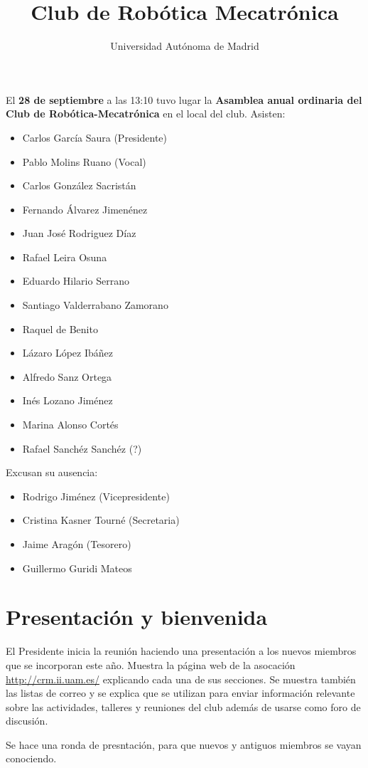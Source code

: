 \documentclass[a4paper]{article}
\title{Club de Robótica Mecatrónica}
\author{Universidad Autónoma de Madrid}
\begin{document}
El \textbf{28 de septiembre} a las 13:10 tuvo lugar la \textbf{Asamblea anual ordinaria del Club de Robótica-Mecatrónica} en el local del club. Asisten:

\begin{itemize}
\item Carlos García Saura (Presidente)
\item Pablo Molins Ruano (Vocal)
\item Carlos González Sacristán
\item Fernando Álvarez Jimenénez
\item Juan José Rodriguez Díaz
\item Rafael Leira Osuna
\item Eduardo Hilario Serrano
\item Santiago Valderrabano Zamorano
\item Raquel de Benito
\item Lázaro López Ibáñez
\item Alfredo Sanz Ortega
\item Inés Lozano Jiménez
\item Marina Alonso Cortés
\item Rafael Sanchéz Sanchéz (?)
\end{itemize}

Excusan su ausencia:
\begin{itemize}
\item Rodrigo Jiménez (Vicepresidente)
\item Cristina Kasner Tourné (Secretaria)
\item Jaime Aragón (Tesorero)
\item Guillermo Guridi Mateos
\end{itemize}


\section{Presentación y bienvenida}

El Presidente inicia la reunión haciendo una presentación a los nuevos miembros que se incorporan este año. Muestra la página web de la asocación \url{http://crm.ii.uam.es/} explicando cada una de sus secciones. Se muestra también las listas de correo y se explica que se utilizan para enviar información relevante sobre las actividades, talleres y reuniones del club además de usarse como foro de discusión.

Se hace una ronda de presntación, para que nuevos y antiguos miembros se vayan conociendo.
\end{document}
